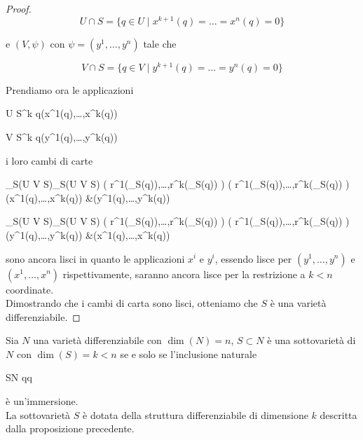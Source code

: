 \begin{proof}
	\begin{equation}
		U \cap S = \{ q \in U \mid x^{k+1}(q) = \dots = x^{n}(q) = 0 \}
	\end{equation}
	
	e $ (V,\psi) $ con $ \psi = (y^{1},\dots,y^{n}) $ tale che
	
	\begin{equation}
		V \cap S = \{ q \in V \mid y^{k+1}(q) = \dots = y^{n}(q) = 0 \}
	\end{equation}

	Prendiamo ora le applicazioni
	
		{U \cap S}{\R^{k}}
		{q}{(x^{1}(q),\dots,x^{k}(q))}

		{V \cap S}{\R^{k}}
		{q}{(y^{1}(q),\dots,y^{k}(q))}

	i loro cambi di carte
	
		{\varphi_{S}(U \cap V \cap S)}{\psi_{S}(U \cap V \cap S)}
		{\left( r^{1}(\varphi_{S}(q)),\dots,r^{k}(\varphi_{S}(q)) \right)}{%
			\left( r^{1}(\psi_{S}(q)),\dots,r^{k}(\psi_{S}(q)) \right) \\
			(x^{1}(q),\dots,x^{k}(q)) &\mapsto (y^{1}(q),\dots,y^{k}(q))}
	
	\map{\varphi_{S} \circ \psi_{S}^{-1}}
		{\psi_{S}(U \cap V \cap S)}{\varphi_{S}(U \cap V \cap S)}
		{\left( r^{1}(\psi_{S}(q)),\dots,r^{k}(\psi_{S}(q)) \right)}{%
			\left( r^{1}(\varphi_{S}(q)),\dots,r^{k}(\varphi_{S}(q)) \right) \\
			(y^{1}(q),\dots,y^{k}(q)) &\mapsto (x^{1}(q),\dots,x^{k}(q))}

	sono ancora lisci in quanto le applicazioni $ x^{i} $ e $ y^{i} $, essendo lisce per $ (y^{1},\dots,y^{n}) $ e $ (x^{1},\dots,x^{n}) $ rispettivamente, saranno ancora lisce per la restrizione a $ k < n $ coordinate. \\
	Dimostrando che i cambi di carta sono lisci, otteniamo che $ S $ è una varietà differenziabile.
\end{proof}

\begin{definition}\label{prop:subman-incl-immersion}
	Sia $ N $ una varietà differenziabile con $ \dim(N) = n $, $ S \subset N $ è una sottovarietà di $ N $ con $ \dim(S) = k < n $ se e solo se l'inclusione naturale
	
		{S}{N}
		{q}{q}

	è un'immersione. \\
	La sottovarietà $ S $ è dotata della struttura differenziabile di dimensione $ k $ descritta dalla proposizione precedente.
\end{definition}

